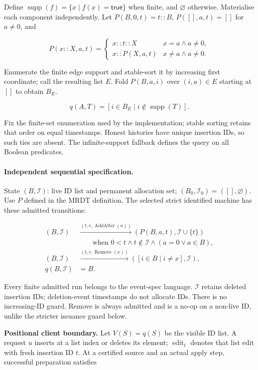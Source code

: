 Define $\operatorname{supp}(f)=\{x\mid f(x)=\mathsf{true}\}$ when finite, and $\varnothing$ otherwise. Materialise each component independently. Let $P(B,0,t)=t::B$, $P([],a,t)=[]$ for $a\ne0$, and

\[
P(x::X,a,t)=\begin{cases}x::t::X&x=a\land a\ne0,\\x::P(X,a,t)&x\ne a\land a\ne0.\end{cases}
\]


Enumerate the finite edge support and stable-sort it by increasing first coordinate; call the resulting list $E$. Fold $P(B,a,i)$ over $(i,a)\in E$ starting at $[]$ to obtain $B_E$.

\[
q(A,T)=[i\in B_E\mid i\notin\operatorname{supp}(T)].
\]


Fix the finite-set enumeration used by the implementation; stable sorting retains that order on equal timestamps. Honest histories have unique insertion IDs, so such ties are absent. The infinite-support fallback defines the query on all Boolean predicates.


\paragraph{Independent sequential specification.}
State $(B,\mathcal I)$: live ID list and permanent allocation set; $(B_0,\mathcal I_0)=([],\varnothing)$. Use $P$ defined in the MRDT definition. The selected strict identified machine has these admitted transitions:

\[
\begin{aligned}(B,\mathcal I)&\xrightarrow{(t,r,\operatorname{AddAfter}(a))}(P(B,a,t),\mathcal I\cup\{t\})\\&\qquad\text{when }0<t\land t\notin\mathcal I\land(a=0\lor a\in B),\\(B,\mathcal I)&\xrightarrow{(t,r,\operatorname{Remove}(x))}([i\in B\mid i\ne x],\mathcal I),\\q(B,\mathcal I)&=B.\end{aligned}
\]


Every finite admitted run belongs to the event-spec language. $\mathcal I$ retains
deleted insertion IDs; deletion-event timestamps do not allocate IDs. There
is no increasing-ID guard. Remove is always admitted and is a no-op on a
non-live ID, unlike the stricter issuance guard below.

\textbf{Positional client boundary.} Let $V(S)=q(S)$ be the visible ID list.
A request $u$ inserts at a list index or deletes its element;
$\operatorname{edit}_t$ denotes that list edit with fresh insertion ID $t$.
At a certified source and an actual apply step, successful preparation satisfies

